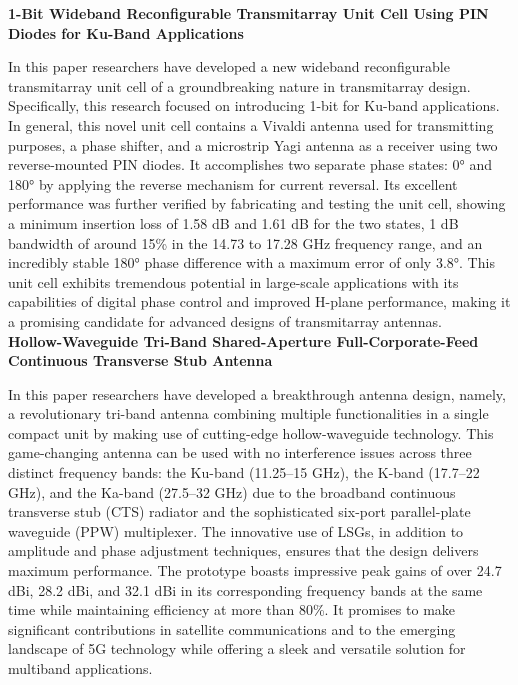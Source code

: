 \documentclass[12pt]{article}
\begin{document}
\noindent \textbf{1-Bit Wideband Reconfigurable Transmitarray Unit Cell Using PIN Diodes for Ku-Band Applications}
\par In this paper researchers have developed a new wideband reconfigurable transmitarray unit cell of a groundbreaking nature in transmitarray design. Specifically, this research focused on introducing 1-bit for Ku-band applications. In general, this novel unit cell contains a Vivaldi antenna used for transmitting purposes, a phase shifter, and a microstrip Yagi antenna as a receiver using two reverse-mounted PIN diodes. It accomplishes two separate phase states: 0° and 180° by applying the reverse mechanism for current reversal. Its excellent performance was further verified by fabricating and testing the unit cell, showing a minimum insertion loss of 1.58 dB and 1.61 dB for the two states, 1 dB bandwidth of around 15\% in the 14.73 to 17.28 GHz frequency range, and an incredibly stable 180° phase difference with a maximum error of only 3.8°. This unit cell exhibits tremendous potential in large-scale applications with its capabilities of digital phase control and improved H-plane performance, making it a promising candidate for advanced designs of transmitarray antennas.\\

\noindent \textbf{Hollow-Waveguide Tri-Band Shared-Aperture Full-Corporate-Feed Continuous Transverse Stub Antenna}
\par In this paper researchers have developed a breakthrough antenna design, namely, a revolutionary tri-band antenna combining multiple functionalities in a single compact unit by making use of cutting-edge hollow-waveguide technology. This game-changing antenna can be used with no interference issues across three distinct frequency bands: the Ku-band (11.25–15 GHz), the K-band (17.7–22 GHz), and the Ka-band (27.5–32 GHz) due to the broadband continuous transverse stub (CTS) radiator and the sophisticated six-port parallel-plate waveguide (PPW) multiplexer. The innovative use of LSGs, in addition to amplitude and phase adjustment techniques, ensures that the design delivers maximum performance. The prototype boasts impressive peak gains of over 24.7 dBi, 28.2 dBi, and 32.1 dBi in its corresponding frequency bands at the same time while maintaining efficiency at more than 80\%. It promises to make significant contributions in satellite communications and to the emerging landscape of 5G technology while offering a sleek and versatile solution for multiband applications.\\
\end{document}
